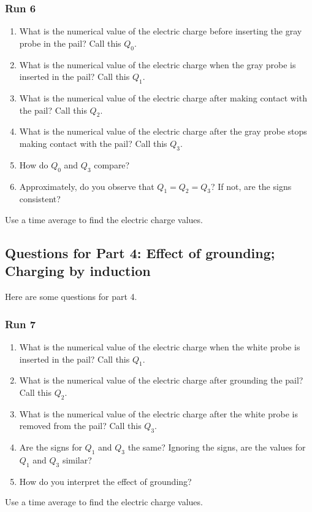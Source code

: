 \subsubsection{Run 6}
%
\begin{enumerate}
	\item What is the numerical value of the electric charge before inserting the gray probe in the pail? Call this $Q_{0}$.
	\item What is the numerical value of the electric charge when the gray probe is inserted in the pail? Call this $Q_{1}$.
	\item What is the numerical value of the electric charge after making contact with the pail? Call this $Q_{2}$.
	\item What is the numerical value of the electric charge after the gray probe stops making contact with the pail? Call this $Q_{3}$.
	\item How do $Q_{0}$ and $Q_{3}$ compare?
	\item Approximately, do you observe that $Q_{1} = Q_{2} = Q_{3}$? If not, are the signs consistent?
\end{enumerate}
Use a time average to find the electric charge values.
%
\subsection{Questions for Part 4: Effect of grounding; Charging by induction}
%
Here are some questions for part 4.
%
\subsubsection{Run 7}
%
\begin{enumerate}
	\item What is the numerical value of the electric charge when the white probe is inserted in the pail? Call this $Q_{1}$.
	\item What is the numerical value of the electric charge after grounding the pail? Call this $Q_{2}$.
	\item What is the numerical value of the electric charge after the white probe is removed from the pail? Call this $Q_{3}$.
	\item Are the signs for $Q_{1}$ and $Q_{3}$ the same? Ignoring the signs, are the values for $Q_{1}$ and $Q_{3}$ similar?
	\item How do you interpret the effect of grounding?
\end{enumerate}
Use a time average to find the electric charge values.
%
